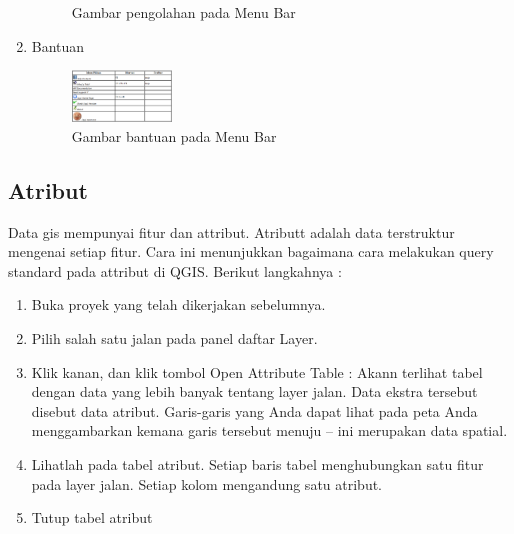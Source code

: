 \begin{enumerate}
\begin{figure}[ht]
    \caption{Gambar pengolahan pada Menu Bar}
    \label{menubar8}
    \end{figure}
\item
Bantuan
\begin{figure}[ht]
    \centerline{\includegraphics[width=0.25\textwidth]{figures/menubar9}}
    \caption{Gambar bantuan pada Menu Bar}
    \label{menubar9}
    \end{figure}
\end{enumerate}

\subsection{Atribut}
Data gis mempunyai fitur dan attribut. Atributt adalah data terstruktur mengenai setiap fitur. Cara ini menunjukkan bagaimana cara melakukan query standard pada attribut di QGIS.
Berikut langkahnya :
\begin{enumerate}
\item
Buka proyek yang telah dikerjakan sebelumnya.
\item
Pilih salah satu jalan pada panel daftar Layer.
\item
Klik kanan, dan klik tombol Open Attribute Table :
Akann terlihat tabel dengan data yang lebih banyak tentang layer jalan. Data ekstra tersebut disebut data atribut. Garis-garis yang Anda dapat lihat pada peta Anda menggambarkan kemana garis tersebut menuju – ini merupakan data spatial.
\item
Lihatlah pada tabel atribut. Setiap baris tabel menghubungkan satu fitur pada layer jalan. Setiap kolom mengandung satu atribut.
\item
Tutup tabel atribut
\end{enumerate}

